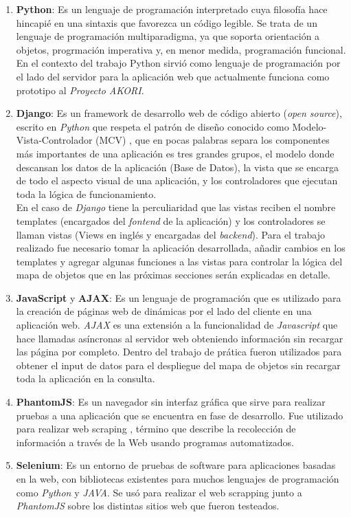 			\begin{enumerate}
				\item \textbf{Python}: Es un lenguaje de programación interpretado cuya filosofía 
				hace hincapié en una sintaxis que favorezca un código legible. Se trata de un 
				lenguaje de programación multiparadigma, ya que soporta orientación a objetos, 
				progrmación imperativa y, en menor medida, programación funcional. En el contexto 
				del trabajo Python sirvió como lenguaje de programación por el lado del servidor 
				para la aplicación web que actualmente funciona como prototipo al \textit{Proyecto AKORI}. 
				\item \textbf{Django}: Es un framework de desarrollo web de código abierto (\textit{open source}), escrito en \textit{Python} que respeta el patrón de diseño conocido como 
				Modelo-Vista-Controlador (MCV) \cite{ref7}, que en pocas palabras separa los componentes más 
				importantes de una aplicación es tres grandes grupos, el modelo donde descansan los
				datos de la aplicación (Base de Datos), la vista que se encarga de todo el aspecto 
				visual de una aplicación, y los controladores que ejecutan toda la lógica de
				funcionamiento. \\ 
				En el caso de \textit{Django} tiene la perculiaridad que las vistas reciben el 
				nombre templates (encargados del \textit{fontend} de la aplicación) y los 
				controladores se llaman vistas (Views en inglés y encargadas del \textit{backend}). 	
				Para el trabajo realizado fue necesario tomar la aplicación desarrollada, añadir
				cambios en los templates y agregar algunas funciones a las vistas para controlar 
				la lógica del mapa de objetos que en las próximas secciones serán explicadas en 
				detalle.
				\item \textbf{JavaScript} y \textbf{AJAX}: Es un lenguaje de programación que 
				es utilizado para la creación de páginas web de dinámicas por el lado del cliente
				en una aplicación web. \textit{AJAX} es una extensión a la funcionalidad de 
				\textit{Javascript} que hace llamadas asíncronas al servidor web obteniendo 
				información sin recargar las página por completo. Dentro del trabajo de prática
				fueron utilizados para obtener el input de datos para el despliegue del mapa de 
				objetos sin recargar toda la aplicación en la consulta. 
				\item \textbf{PhantomJS}: Es un navegador sin interfaz gráfica que sirve para 
				realizar pruebas a una aplicación que se encuentra en fase de desarrollo. Fue 
				utilizado para realizar web scraping \cite{ref8}, término que describe la recolección de 
				información a través de la Web usando programas automatizados.
				\item \textbf{Selenium}: Es un entorno de pruebas de software para aplicaciones 
				basadas en la web, con bibliotecas existentes para muchos lenguajes de programación
				como \textit{Python} y \textit{JAVA}. Se usó para realizar el web scrapping 
				junto a \textit{PhantomJS} sobre los distintas sitios web que fueron testeados.
			\end{enumerate}
